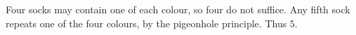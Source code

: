 Four socks may contain one of each colour, so four do not suffice. Any fifth sock repeats one of the four colours, by the pigeonhole principle. Thus $\boxed5$.
